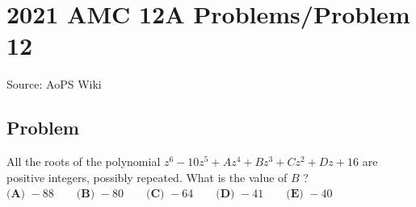 \documentclass[12pt]{article}
\begin{document}
\section*{{2021 AMC 12A Problems/Problem 12}}
Source: AoPS Wiki

\subsection*{Problem}
All the roots of the polynomial $z^6-10z^5+Az^4+Bz^3+Cz^2+Dz+16$ are positive integers, possibly repeated. What is the value of $B$ ? $\textbf{(A) }{-}88 \qquad \textbf{(B) }{-}80 \qquad \textbf{(C) }{-}64 \qquad \textbf{(D) }{-}41\qquad \textbf{(E) }{-}40$
\end{document}

